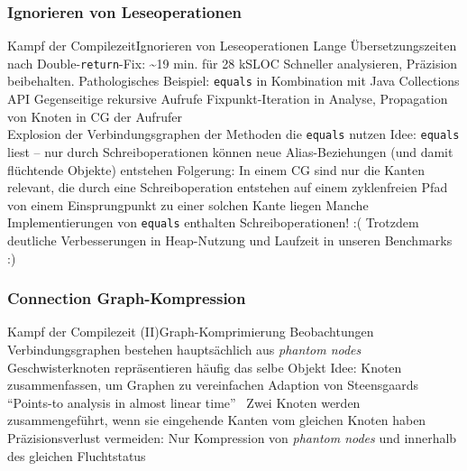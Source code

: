 \documentclass[usenames,dvipsnames,smaller]{beamer}
\begin{document}
			\subsubsection{Ignorieren von Leseoperationen}
				\begin{frame}{Kampf der Compilezeit}{Ignorieren von Leseoperationen}
					\bi
						\ii Lange Übersetzungszeiten nach Double-\texttt{return}-Fix: \textasciitilde 19 min. für 28 kSLOC
							\bi
								\ii[$\Rightarrow$] Schneller analysieren, Präzision beibehalten. 
							\ei
						\ii<2-> Pathologisches Beispiel: \texttt{equals} in Kombination mit Java Collections API
							\bi
								\ii Gegenseitige rekursive Aufrufe
								\ii Fixpunkt-Iteration in Analyse, Propagation von Knoten in CG der Aufrufer\\
								\structure{$\Rightarrow$} Explosion der Verbindungsgraphen der Methoden die \texttt{equals} nutzen
							\ei
						\ii<3-> Idee: \texttt{equals} liest -- nur durch Schreiboperationen können neue Alias-Beziehungen (und damit flüchtende Objekte) entstehen
							\bi
								\ii Folgerung: In einem CG sind nur die Kanten relevant, die
									\bi
										\ii durch eine Schreiboperation entstehen
										\ii auf einem zyklenfreien Pfad von einem Einsprungpunkt zu einer solchen Kante liegen
									\ei
							\ei
						\ii<4-> Manche Implementierungen von \texttt{equals} enthalten Schreiboperationen! :(
						\ii<4-> Trotzdem deutliche Verbesserungen in Heap-Nutzung und Laufzeit in unseren Benchmarks :)
					\ei
				\end{frame}

			\subsubsection{Connection Graph-Kompression}
				\begin{frame}{Kampf der Compilezeit (II)}{Graph-Komprimierung}
					\bi
						\ii Beobachtungen
							\bi
								\ii Verbindungsgraphen bestehen hauptsächlich aus \emph{phantom nodes}
								\ii Geschwisterknoten repräsentieren häufig das selbe Objekt
							\ei
						\ii Idee: Knoten zusammenfassen, um Graphen zu vereinfachen
						\ii<2-> Adaption von Steensgaards \enquote{Points-to analysis in almost linear time}~\cite{steensgaard:96:popl}
							\bi
								\ii Zwei Knoten werden zusammengeführt, wenn sie eingehende Kanten vom gleichen Knoten haben
								\ii Präzisionsverlust vermeiden: Nur Kompression von \emph{phantom nodes} und innerhalb des gleichen Fluchtstatus
							\ei
					\ei
				\end{frame}
\end{document}
